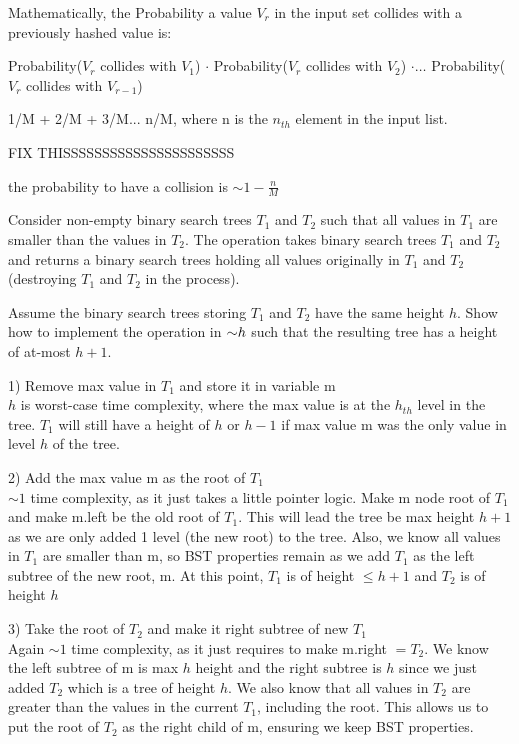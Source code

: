 \begin{problem}
\begin{questions}
Mathematically, the Probability a value $V_r$ in the input set collides with a previously hashed value is:

Probability($V_r$ collides with $V_1$) $\cdot$ Probability($V_r$ collides with $V_2$) $\cdot \dots$ Probability($V_r$ collides with $V_{r-1}$)

1/M + 2/M + 3/M... n/M, where n is the $n_{th}$ element in the input list.

FIX THISSSSSSSSSSSSSSSSSSSSSS

the probability to have a collision is $\sim 1 - \frac{n}{M}$

\end{questions}
\end{problem}

\begin{problem}
Consider non-empty binary search trees $T_1$ and $T_2$ such that all values in $T_1$ are smaller than the values in $T_2$. The  operation takes binary search trees $T_1$ and $T_2$ and returns a binary search trees holding all values originally in $T_1$ and $T_2$ (destroying $T_1$ and $T_2$ in the process). 
\begin{questions}
\item Assume the binary search trees storing $T_1$ and $T_2$ have the same height $h$. Show how to implement the  operation in $\mathord{\sim}h$ such that the resulting tree has a height of at-most $h+1$.

1) Remove max value in $T_1$ and store it in variable m\\
$h$ is worst-case time complexity, where the max value is at the $h_{th}$ level in the tree. $T_1$ will still have a height of $h$ or $h-1$ if max value m was the only value in level $h$ of the tree.

2) Add the max value m as the root of $T_1$\\
$\sim 1$ time complexity, as it just takes a little pointer logic. Make m node root of $T_1$ and make m.left be the old root of $T_1$. This will lead the tree be max height $h+1$ as we are only added 1 level (the new root) to the tree.
Also, we know all values in $T_1$ are smaller than m, so BST properties remain as we add $T_1$ as the left subtree of the new root, m.
At this point, $T_1$ is of height $ \leq h+1$ and $T_2$ is of height $h$

3) Take the root of $T_2$ and make it right subtree of new $T_1$\\
Again $\sim 1$ time complexity, as it just requires to make m.right $ = T_2$. We know the left subtree of m is max $h$ height and the right subtree is $h$ since we just added $T_2$ which is a tree of height $h$.
We also know that all values in $T_2$ are greater than the values in the current $T_1$, including the root. This allows us to put the root of $T_2$ as the right child of m, ensuring we keep BST properties.


\end{questions}
\end{problem}
